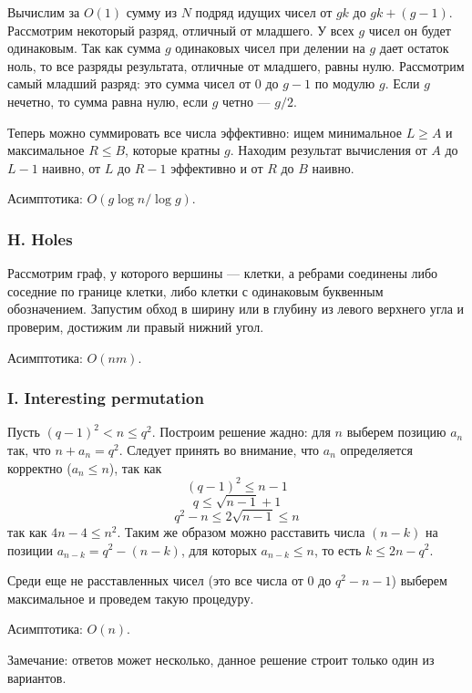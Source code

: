 Вычислим за $O(1)$ сумму из $N$ подряд идущих чисел от $g k$ до $g k + (g - 1)$. Рассмотрим некоторый разряд, отличный от младшего. У всех $g$ чисел он будет одинаковым. Так как сумма $g$ одинаковых чисел при делении на $g$ дает остаток ноль, то все разряды результата, отличные от младшего, равны нулю. Рассмотрим самый младший разряд: это сумма чисел от $0$ до $g-1$ по модулю $g$. Если $g$ нечетно, то сумма равна нулю, если $g$ четно --- $g / 2$. 

Теперь можно суммировать все числа эффективно: ищем минимальное $L \geqslant A$ и максимальное $R \leqslant B$, которые кратны $g$. Находим результат вычисления от $A$ до $L-1$ наивно, от $L$ до $R-1$ эффективно и от $R$ до $B$ наивно.  

Асимптотика: $O(g \log{n} / \log{g})$.



\subsubsection*{H. Holes} 


Рассмотрим граф, у которого вершины --- клетки, а ребрами соединены либо соседние по границе клетки, либо  клетки с одинаковым буквенным обозначением. Запустим обход в ширину или в глубину из левого верхнего угла и проверим, достижим ли правый нижний угол.

Асимптотика: $O(n m)$.



\subsubsection*{I. Interesting permutation} 


Пусть $(q-1)^2 < n \leqslant q^2$. Построим решение жадно: для $n$ выберем позицию $a_n$ так, что $n + a_n = q^2$. Следует принять во внимание, что $a_n$ определяется корректно ($a_n \leqslant n$), так как 
$$(q-1)^2 \leqslant n - 1$$
$$q \leqslant \sqrt{n-1} + 1$$
$$q^2 - n \leqslant 2 \sqrt{n-1} \leqslant n$$
так как $4 n - 4 \leqslant n^2$. Таким же образом можно расставить числа $(n-k)$ на позиции $a_{n-k} = q^2 - (n-k)$, для которых $a_{n-k} \leqslant n$, то есть $k \leqslant 2 n - q^2$. 

Среди еще не расставленных чисел (это все числа от 0 до $q^2 - n - 1$) выберем максимальное и проведем такую процедуру.

Асимптотика: $O(n)$.

Замечание: ответов может несколько, данное решение строит только один из вариантов.

\newpage